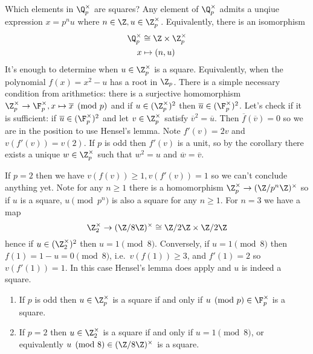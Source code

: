 \documentclass[a4paper]{article}
\begin{document}
\begin{eg}
  Which elements in \(\Q_p^\times\) are squares? Any element of \(\Q_p^\times\) admits a unqiue expression \(x = p^n u\) where \(n \in \Z, u \in \Z_p^\times\). Equivalently, there is an isomorphism
  \begin{align*}
    \Q_p^\times &\cong \Z \times \Z_p^\times \\
    x &\mapsto (n, u)
  \end{align*}
  It's enough to determine when \(u \in \Z_p^\times\) is a square. Equivalently, when the polynomial \(f(x) = x^2 - u\) has a root in \(\Z_p\). There is a simple necessary condition from arithmetics: there is a surjective homomorphism \(\Z_p^\times \to \F_p^\times, x \mapsto \overline x \pmod p\) and if \(u \in (\Z_p^\times)^2\) then \(\overline u \in (\F_p^\times)^2\). Let's check if it is sufficient: if \(\overline u \in (\F_p^\times)^2\) and let \(v \in \Z_p^\times\) satisfy \(\overline v^2 = \overline u\). Then \(\overline f(\overline v) = 0\) so we are in the position to use Hensel's lemma. Note \(f'(v) = 2v\) and \(v(f'(v)) = v(2)\). If \(p\) is odd then \(f'(v)\) is a unit, so by the corollary there exists a unique \(w \in \Z_p^\times\) such that \(w^2 = u\) and \(\overline w = \overline v\).

  If \(p = 2\) then we have \(v(f(v)) \geq 1, v(f'(v)) = 1\) so we can't conclude anything yet. Note for any \(n \geq 1\) there is a homomorphism \(\Z_p^\times \to (\Z/p^n\Z)^\times\) so if \(u\) is a square, \(u \pmod{p^n}\) is also a square for any \(n \geq 1\). For \(n = 3\) we have a map
  \[
    \Z_2^\times \to (\Z/8\Z)^\times \cong \Z/2\Z \times \Z/2\Z
  \]
  hence if \(u \in (\Z_2^\times)^2\) then \(u = 1 \pmod 8\). Conversely, if \(u = 1 \pmod 8\) then \(f(1) = 1 - u = 0 \pmod 8\), i.e.\ \(v(f(1)) \geq 3\), and \(f'(1) = 2\) so \(v(f'(1)) = 1\). In this case Hensel's lemma does apply and \(u\) is indeed a square.
\end{eg}

\begin{proposition}\leavevmode
  \begin{enumerate}
  \item If \(p\) is odd then \(u \in \Z_p^\times\) is a square if and only if \(u \pmod p \in \F_p^\times\) is a square.
  \item If \(p = 2\) then \(u \in \Z_2^\times\) is a square if and only if \(u = 1 \pmod 8\), or equivalently \(u \pmod 8 \in (\Z/8\Z)^\times\) is a square.
  \end{enumerate}
\end{proposition}
\end{document}
